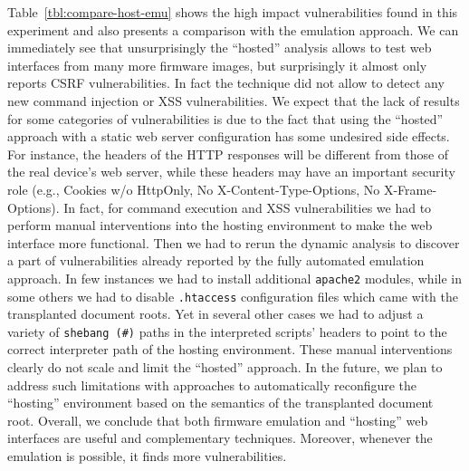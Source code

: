 \documentclass[conference]{./templates/ndss/IEEEtran}
\newcounter{t0d0_counter}
\newcounter{pr00f_counter}
\begin{document}
Table~\ref{tbl:compare-host-emu} shows the high impact vulnerabilities found
in this experiment and also presents a comparison with the emulation approach.  We can
immediately see that unsurprisingly the ``hosted'' analysis allows to test web interfaces from many more 
firmware images, but surprisingly it almost only reports CSRF
vulnerabilities. In fact the technique did not allow to detect any new command injection or XSS vulnerabilities.
We expect that the lack of results for some categories of vulnerabilities
is due to the fact that using the ``hosted'' approach
with a static web server configuration has some undesired
side effects. For instance, the headers of the HTTP responses will be
different from those of the real device's web server, while these headers may 
have an important security role (e.g., Cookies w/o HttpOnly, No
X-Content-Type-Options, No X-Frame-Options). In fact, for command execution 
and XSS vulnerabilities we had to perform manual interventions into 
the hosting environment to make the web interface more functional. Then we had 
to rerun the dynamic analysis to discover a part of vulnerabilities 
already reported by the fully automated emulation approach. 
In few instances we had to install additional \texttt{apache2} modules, while 
in some others we had to disable \texttt{.htaccess} configuration 
files which came with the transplanted document roots. 
Yet in several other cases we had to adjust a variety of \texttt{shebang (\#)} 
paths in the interpreted scripts' headers to point to the correct interpreter 
path of the hosting environment. 
These manual interventions clearly do not scale and limit the ``hosted'' 
approach. In the future, we plan to address such limitations with 
approaches to automatically reconfigure the ``hosting'' environment 
based on the semantics of the transplanted document root. 
Overall, we conclude that both firmware emulation and ``hosting'' web
interfaces are useful and complementary techniques. Moreover, whenever
the emulation is possible, it finds more vulnerabilities.
\end{document}
